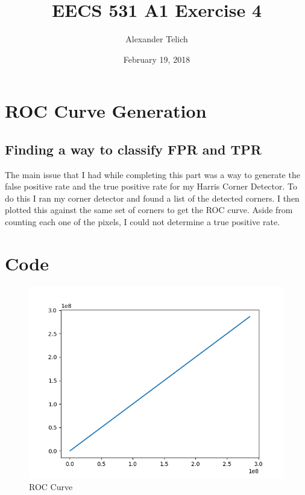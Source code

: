 \documentclass[11pt]{article}
\author{Alexander Telich}
\title{EECS 531 A1 Exercise 4}
\date{February 19, 2018}
\begin{document}
    \maketitle
    \section{ROC Curve Generation}\label{sec:exercise4}
    \subsection{Finding a way to classify FPR and TPR}\label{subsec:1.FPR and TPR}
    \setlength\parindent{24pt}
    The main issue that I had while completing this part was a way to generate the
    false positive rate and the true positive rate for my Harris Corner Detector.
    To do this I ran my corner detector and found a list of the detected corners.
    I then plotted this against the same set of corners to get the ROC curve.
    Aside from counting each one of the pixels, I could not determine a true positive rate.

    \section{Code}\label{sec:codeExplanation}
    

    \begin{figure}[h]
        \caption{ROC Curve}
        \centering
        \includegraphics[scale=0.7]{myplot.png}
    \end{figure}
\end{document}
